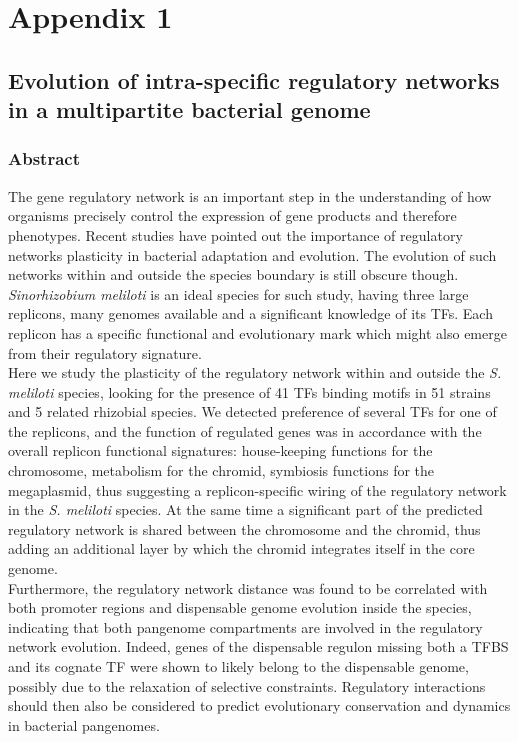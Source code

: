 \logvartrue
\chapter{Appendix 1}

\section{Evolution of intra-specific regulatory networks in a multipartite bacterial genome}
\subsection{Abstract}
The gene regulatory network is an important step in the understanding of how organisms precisely control the expression of gene products and therefore phenotypes. Recent studies have pointed out the importance of regulatory networks plasticity in bacterial adaptation and evolution. The evolution of such networks within and outside the species boundary is still obscure though. \textit{Sinorhizobium meliloti} is an ideal species for such study, having three large replicons, many genomes available and a significant knowledge of its TFs. Each replicon has a specific functional and evolutionary mark which might also emerge from their regulatory signature.\\
Here we study the plasticity of the regulatory network within and outside the \textit{S. meliloti} species, looking for the presence of 41 TFs binding motifs in 51 strains and 5 related rhizobial species. We detected preference of several TFs for one of the replicons, and the function of regulated genes was in accordance with the overall replicon functional signatures: house-keeping functions for the chromosome, metabolism  for the chromid, symbiosis functions for the megaplasmid, thus suggesting a replicon-specific wiring of the regulatory network in the \textit{S. meliloti} species. At the same time a significant part of the predicted regulatory network is shared between the chromosome and the chromid, thus adding an additional layer by which the chromid integrates itself in the core genome.\\
Furthermore, the regulatory network distance was found to be correlated with both promoter regions and dispensable genome evolution inside the species, indicating that both pangenome compartments are involved in the regulatory network evolution. Indeed, genes of the dispensable regulon missing both a TFBS and its cognate TF were shown to likely belong to the dispensable genome, possibly due to the relaxation of selective constraints. Regulatory interactions should then also be considered to predict evolutionary conservation and dynamics in bacterial pangenomes.\\

